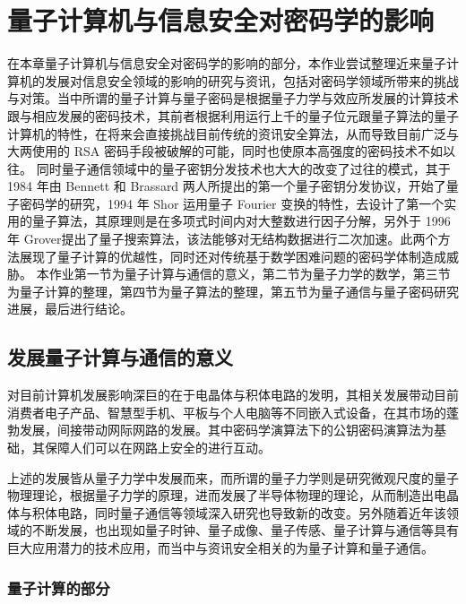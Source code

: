 \chapter{量子计算机与信息安全对密码学的影响}
\label{chap:3}

在本章量子计算机与信息安全对密码学的影响的部分，本作业尝试整理近来量子计算机的发展对信息安全领域的影响的研究与资讯，包括对密码学领域所带来的挑战与对策。当中所谓的量子计算与量子密码是根据量子力学与效应所发展的计算技术跟与相应发展的密码技术，其前者根据利用运行上千的量子位元跟量子算法的量子计算机的特性，在将来会直接挑战目前传统的资讯安全算法，从而导致目前广泛与大两使用的 RSA 密码手段被破解的可能，同时也使原本高强度的密码技术不如以往。
同时量子通信领域中的量子密钥分发技术也大大的改变了过往的模式，其于 1984 年由 Bennett 和 Brassard 两人所提出的第一个量子密钥分发协议，开始了量子密码学的研究，1994 年 Shor 运用量子 Fourier 变换的特性，去设计了第一个实用的量子算法，其原理则是在多项式时间内对大整数进行因子分解，另外于 1996 年 Grover提出了量子搜索算法，该法能够对无结构数据进行二次加速。此两个方法展现了量子计算的优越性，同时还对传统基于数学困难问题的密码学体制造成威胁。
本作业第一节为量子计算与通信的意义，第二节为量子力学的数学，第三节为量子计算的整理，第四节为量子算法的整理，第五节为量子通信与量子密码研究进展，最后进行结论。


\section{发展量子计算与通信的意义}

对目前计算机发展影响深巨的在于电晶体与积体电路的发明，其相关发展带动目前消费者电子产品、智慧型手机、平板与个人电脑等不同嵌入式设备，在其市场的蓬勃发展，间接带动网际网路的发展。其中密码学演算法下的公钥密码演算法为基础，其保障人们可以在网路上安全的进行互动。

上述的发展皆从量子力学中发展而来，而所谓的量子力学则是研究微观尺度的量子物理理论，根据量子力学的原理，进而发展了半导体物理的理论，从而制造出电晶体与积体电路，同时量子通信等领域深入研究也导致新的改变。另外随着近年该领域的不断发展，也出现如量子时钟、量子成像、量子传感、量子计算与通信等具有巨大应用潜力的技术应用，而当中与资讯安全相关的为量子计算和量子通信。

\subsection{量子计算的部分}

